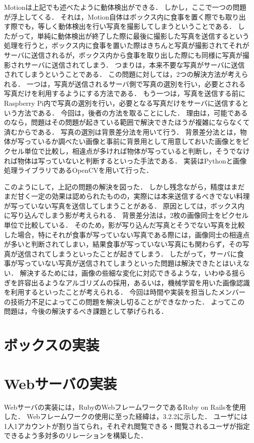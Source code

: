 \documentclass[../report]{subfiles}
\begin{document}
Motionは上記でも述べたように動体検出ができる．
しかし，ここで一つの問題が浮上してくる．
それは，Motion自体はボックス内に食事を置く際でも取り出す際でも，等しく動体検出を行い写真を撮影してしまうということである．
したがって，単純に動体検出が終了した際に最後に撮影した写真を送信するという処理を行うと，ボックス内に食事を置いた際はきちんと写真が撮影されてそれがサーバに送信されるが，ボックス内から食事を取り出した際にも同様に写真が撮影されサーバに送信されてしまう．
つまりは，本来不要な写真がサーバに送信されてしまうということである．
この問題に対しては，2つの解決方法が考えられる．
一つは，写真が送信されるサーバ側で写真の選別を行い，必要とされる写真だけを利用するようにする方法である．
もう一つは，写真を送信する前にRaspberry Pi内で写真の選別を行い，必要となる写真だけをサーバに送信するという方法である．
今回は，後者の方法を取ることにした．
理由は，可能であるのなら，問題はその問題が起きている範囲で解決できたほうが複雑にならなくて済むからである．
写真の選別は背景差分法を用いて行う．
背景差分法とは，物体が写っているか調べたい画像と事前に背景用として用意しておいた画像とをピクセル単位で比較し，相違点が多ければ物体が写っていると判断し，そうでなければ物体は写っていないと判断するといった手法である．
実装はPythonと画像処理ライブラリであるOpenCVを用いて行った．

このようにして，上記の問題の解決を図った．
しかし残念ながら，精度はまだまだ甘く一定の効果は認められたものの，実際には本来送信するべきでない料理が写っていない写真を送信してしまうことがある．
原因としては，ボックス内に写り込んでしまう影が考えられる．
背景差分法は，2枚の画像同士をピクセル単位で比較している．
そのため，影が写り込んだ写真とそうでない写真を比較した場合，特にそれが食事が写っていない写真である際には，画像同士の相違点が多いと判断されてしまい，結果食事が写っていない写真にも関わらず，その写真が送信されてしまうといったことが起きてしまう．
したがって，サーバに食事が写っていない写真が送信されてしまうといった問題は解決できたとはいえない．
解決するためには，画像の些細な変化に対応できるような，いわゆる揺らぎを許容出るようなアルゴリズムの採用，あるいは，機械学習を用いた画像認識を利用するといったことが考えられる．
今回は時間や実装を担当したメンバーの技術力不足によってこの問題を解決し切ることができなかった．
よってこの問題は，今後の解決するべき課題として挙げられる．


\section{ボックスの実装}


\section{Webサーバの実装}
Webサーバの実装には，RubyのWebフレームワークであるRuby on Railsを使用した．
Webフレームワークの使用に至った経緯は，3.2.2に示した．
ユーザには1人1アカウントが割り当てられ，それぞれ閲覧できる・閲覧されるユーザが指定できるよう多対多のリレーションを構築した．
\end{document}
